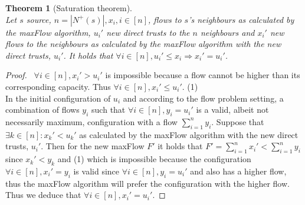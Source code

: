 \documentclass[11pt]{article}
\newtheorem{theorem}{Theorem}[section]
\theoremstyle{definition}
\theoremstyle{corollary}
\theoremstyle{lemma}
\begin{document}
    \begin{theorem}[Saturation theorem] \ \\ 
    \label{saturation}
       Let $s$ source, $n = |N^{+}(s)|, x_i, i \in [n]$, flows to $s$'s neighbours as calculated by the
       maxFlow algorithm, $u_i'$ new direct trusts to the $n$ neighbours and $x_i'$ new flows to the neighbours
       as calculated by the maxFlow algorithm with the new direct trusts, $u_i'$. It holds that
       $\forall i \in [n], u_i' \leq x_i \Rightarrow x_i' = u_i'$.
    \end{theorem}
    \begin{proof} \ 
       $\forall i \in [n], x_i' > u_i'$ is impossible because a flow cannot be higher than its
       corresponding capacity. Thus $\forall i \in [n], x_i' \leq u_i'$. (1) \\
       In the initial configuration of $u_i$ and according to the flow problem setting, a combination of flows
       $y_i$ such that $\forall i \in [n], y_i = u_i'$ is a valid, albeit not necessarily maximum,
       configuration with a flow $\sum\limits_{i=1}^{n}y_i$. Suppose that $\exists k \in [n] : x_k'
       < u_k'$ as calculated by the maxFlow algorithm with the new direct trusts, $u_i'$. Then for the new
       maxFlow $F'$ it holds that $F' = \sum\limits_{i=1}^{n}x_i' < \sum\limits_{i=1}^{n}y_i$ since $x_k' < y_k$
       and (1) which is impossible because the configuration $\forall i \in [n], x_i' = y_i$ is valid since 
       $\forall i \in [n], y_i = u_i'$ and also has a higher flow, thus the maxFlow algorithm will
       prefer the configuration with the higher flow. Thus we deduce that $\forall i \in [n], x_i' = u_i'$.
    \end{proof}
\end{document}
